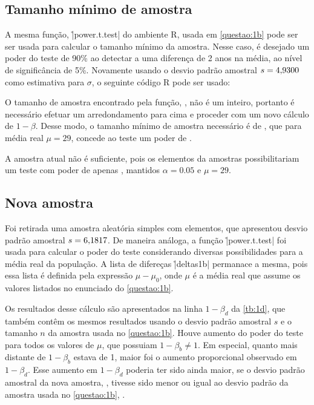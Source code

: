

\subsection{Tamanho mínimo de amostra}
\label{questao:1c}

A mesma função, \r|power.t.test| do ambiente R, usada em \autoref{questao:1b} pode ser ser usada para calcular o tamanho mínimo da amostra. Nesse caso, é desejado um poder do teste de 90\% ao detectar a uma diferença de 2 anos na média, ao nível de significância de 5\%. Novamente usando o desvio padrão amostral $s = \num{4.9300}$ como estimativa para $\sigma$, o seguinte código R pode ser usado:


O tamanho de amostra encontrado pela função, \UMCn, não é um inteiro, portanto é necessário efetuar um arredondamento para cima e proceder com um novo cálculo de $1-\beta$. Desse modo, o tamanho mínimo de amostra necessário é de \UMCnMin, que para média real $\mu = 29$, concede ao teste um poder de \UMCbeta.

A amostra atual não é suficiente, pois os \UMAn elementos da amostras possibilitariam um teste com poder de apenas \UMCbetaOld, mantidos $\alpha = 0.05$ e $\mu = 29$.

\subsection{Nova amostra}
\label{questao:1d}

Foi retirada uma amostra aleatória simples com \UMCnMin elementos, que apresentou desvio padrão amostral $s = \num{6.1817}$. De maneira análoga, a função \r|power.t.test| foi usada para calcular o poder do teste considerando diversas possibilidades para a média real da população. A lista de difereças \r|deltas1b|  permanace a mesma, pois essa lista é definida pela expressão $\mu - \mu_0$, onde $\mu$ é a média real que assume os valores listados no enunciado do \autoref{questao:1b}.


Os resultados desse cálculo são apresentados na linha $1 - \beta_d$ da \autoref{tb:1d}, que também contêm os mesmos resultados usando o desvio padrão amostral $s$ e o tamanho $n$ da amostra usada no \autoref{questao:1b}. Houve aumento do poder do teste para todos os valores de $\mu$, que possuiam $1 - \beta_b \neq 1$. Em especial, quanto mais distante de $1 - \beta_b$ estava de 1, maior foi o aumento proporcional observado em $1 - \beta_d$. Esse aumento em $1 - \beta_d$ poderia ter sido ainda maior, se o desvio padrão amostral da nova amostra, \UMDs, tivesse sido menor ou igual ao desvio padrão da amostra usada no \autoref{questao:1b}, \UMAs.

